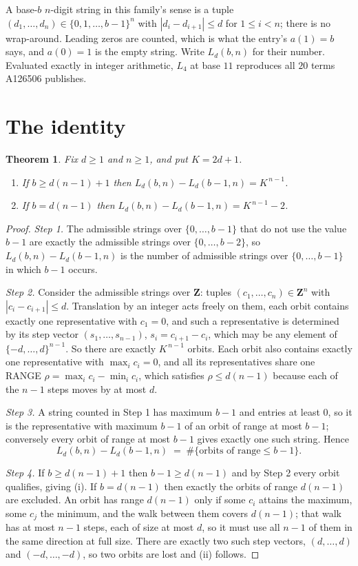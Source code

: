 \documentclass[11pt,a4paper]{article}
\theoremstyle{plain}
\newtheorem{theorem}{Theorem}
\theoremstyle{definition}
\begin{document}
A base-$b$ $n$-digit string in this family's sense is a tuple
$(d_1,\dots,d_n)\in\{0,1,\dots,b-1\}^{n}$ with $|d_i-d_{i+1}|\le d$ for $1\le i<n$; there
is no wrap-around. Leading zeros are counted, which is what the entry's $a(1)=b$ says, and
$a(0)=1$ is the empty string. Write $L_d(b,n)$ for their number. Evaluated exactly in integer
arithmetic, $L_{4}$ at base $11$ reproduces all $20$ terms A126506 publishes.

\section{The identity}

\begin{theorem}
Fix $d\ge1$ and $n\ge1$, and put $K=2d+1$.
\begin{enumerate}
\item[(i)] If $b\ge d(n-1)+1$ then $L_d(b,n)-L_d(b-1,n)=K^{\,n-1}$.
\item[(ii)] If $b=d(n-1)$ then $L_d(b,n)-L_d(b-1,n)=K^{\,n-1}-2$.
\end{enumerate}
\end{theorem}

\begin{proof}
\emph{Step 1.} The admissible strings over $\{0,\dots,b-1\}$ that do not use the value $b-1$
are exactly the admissible strings over $\{0,\dots,b-2\}$, so $L_d(b,n)-L_d(b-1,n)$ is the
number of admissible strings over $\{0,\dots,b-1\}$ in which $b-1$ occurs.

\emph{Step 2.} Consider the admissible strings over $\mathbf{Z}$: tuples
$(c_1,\dots,c_n)\in\mathbf{Z}^{n}$ with $|c_i-c_{i+1}|\le d$. Translation by an integer acts
freely on them, each orbit contains exactly one representative with $c_1=0$, and such a
representative is determined by its step vector $(s_1,\dots,s_{n-1})$, $s_i=c_{i+1}-c_i$,
which may be any element of $\{-d,\dots,d\}^{n-1}$. So there are exactly $K^{\,n-1}$ orbits.
Each orbit also contains exactly one representative with $\max_i c_i=0$, and all its
representatives share one RANGE $\rho=\max_ic_i-\min_ic_i$, which satisfies
$\rho\le d(n-1)$ because each of the $n-1$ steps moves by at most $d$.

\emph{Step 3.} A string counted in Step 1 has maximum $b-1$ and entries at least $0$, so it is
the representative with maximum $b-1$ of an orbit of range at most $b-1$; conversely every orbit
of range at most $b-1$ gives exactly one such string. Hence
\[
L_d(b,n)-L_d(b-1,n)\;=\;\#\{\text{orbits of range}\le b-1\} .
\]

\emph{Step 4.} If $b\ge d(n-1)+1$ then $b-1\ge d(n-1)$ and by Step 2 every orbit qualifies,
giving (i). If $b=d(n-1)$ then exactly the orbits of range $d(n-1)$ are excluded. An orbit has
range $d(n-1)$ only if some $c_i$ attains the maximum, some $c_j$ the minimum, and the walk
between them covers $d(n-1)$; that walk has at most $n-1$ steps, each of size at most $d$, so it
must use all $n-1$ of them in the same direction at full size. There are exactly two such step
vectors, $(d,\dots,d)$ and $(-d,\dots,-d)$, so two orbits are lost and (ii) follows.
\end{proof}
\end{document}
